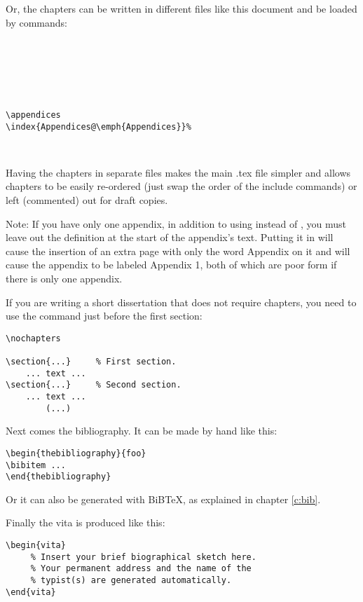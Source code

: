 %
%
%
%
%

Or, the chapters can be written in different files like this document
and be loaded by  commands:
\begin{verbatim}






\appendices
\index{Appendices@\emph{Appendices}}%



\end{verbatim}
%
Having the chapters in separate files makes the main .tex file simpler
and allows chapters to be easily re-ordered (just swap the order of the
include commands) or left (commented) out for draft copies.

Note: If you have only one appendix, in addition to using
 instead of , you must leave out the
 definition at the start of the appendix's text. Putting
it in will cause the insertion of an extra page with only the word
Appendix on it and will cause the appendix to be labeled Appendix 1,
both of which are poor form if there is only one appendix.

If you are writing a short dissertation 
%
that does not require 
chapters, you need to use the command  
%
just before the first section:

\begin{verbatim}
\nochapters 

\section{...}     % First section.
    ... text ... 
\section{...}     % Second section.
    ... text ... 
        (...)
\end{verbatim}

Next comes the bibliography.
%
It can be made by hand like this:
\begin{verbatim}
\begin{thebibliography}{foo}
\bibitem ...   
\end{thebibliography}
\end{verbatim}
%
Or it can also be generated with BiB\TeX{}, 
%
as explained in chapter \ref{c:bib}.

Finally the vita is produced like this:
\begin{verbatim}
\begin{vita}
     % Insert your brief biographical sketch here. 
     % Your permanent address and the name of the 
     % typist(s) are generated automatically.
\end{vita}

\end{verbatim}
